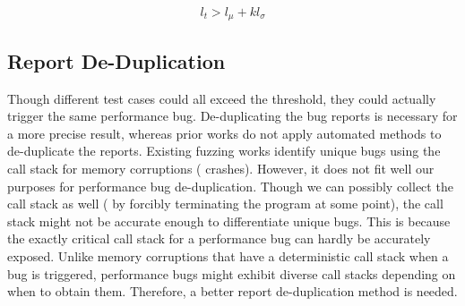 \begin{equation} \label{label}
    l_{t} > l_{\mu} + kl_{\sigma}
\end{equation}

\subsection{Report De-Duplication}
\label{s:method-de-duplicating}

Though different test cases could all exceed the threshold, they could actually trigger the same performance bug.
%
De-duplicating the bug reports is necessary for a more precise result,
whereas prior works \cite{slowfuzz, perffuzz} do not apply automated methods to de-duplicate the reports.
%
Existing fuzzing works identify unique bugs using the call stack for memory corruptions (\eg{,} crashes).
%
However, it does not fit well our purposes for performance bug de-duplication.
%
Though we can possibly collect the call stack as well (\eg{,} by forcibly terminating the program at some point), the call stack might not be accurate enough to differentiate unique bugs.
%
This is because the exactly critical call stack for a performance bug can hardly be accurately exposed.
%
Unlike memory corruptions that have a deterministic call stack when a bug is triggered,
performance bugs might exhibit diverse call stacks depending on when to obtain them.
%
Therefore, a better report de-duplication method is needed.

